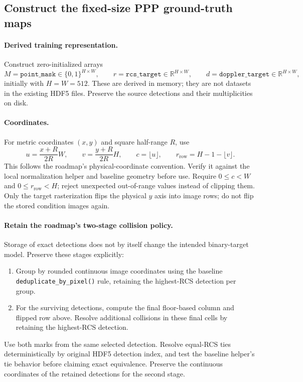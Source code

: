 \documentclass[11pt,a4paper]{article}
\begin{document}
\subsection{Construct the fixed-size PPP ground-truth maps}

\paragraph{Derived training representation.}
Construct zero-initialized arrays
\[
 M=\texttt{point\_mask}\in\{0,1\}^{H\times W},\qquad
 r=\texttt{rcs\_target}\in\mathbb R^{H\times W},\qquad
 d=\texttt{doppler\_target}\in\mathbb R^{H\times W},
\]
initially with \(H=W=512\). These are derived in memory; they are not datasets in the existing HDF5 files. Preserve the source detections and their multiplicities on disk.

\paragraph{Coordinates.}
For metric coordinates \((x,y)\) and square half-range \(R\), use
\[
 u=\frac{x+R}{2R}W,\qquad v=\frac{y+R}{2R}H,\qquad
 c=\lfloor u\rfloor,\qquad r_{\mathrm{row}}=H-1-\lfloor v\rfloor.
\]
This follows the roadmap's physical-coordinate convention. Verify it against the local normalization helper and baseline geometry before use. Require \(0\le c<W\) and \(0\le r_{\mathrm{row}}<H\); reject unexpected out-of-range values instead of clipping them. Only the target rasterization flips the physical \(y\) axis into image rows; do not flip the stored condition images again.

\paragraph{Retain the roadmap's two-stage collision policy.}
Storage of exact detections does not by itself change the intended binary-target model. Preserve these stages explicitly:
\begin{enumerate}[label=\arabic*.]
 \item Group by rounded continuous image coordinates using the baseline \texttt{deduplicate\_by\_pixel()} rule, retaining the highest-RCS detection per group.
 \item For the surviving detections, compute the final floor-based column and flipped row above. Resolve additional collisions in these final cells by retaining the highest-RCS detection.
\end{enumerate}
Use both marks from the same selected detection. Resolve equal-RCS ties deterministically by original HDF5 detection index, and test the baseline helper's tie behavior before claiming exact equivalence. Preserve the continuous coordinates of the retained detections for the second stage.
\end{document}
